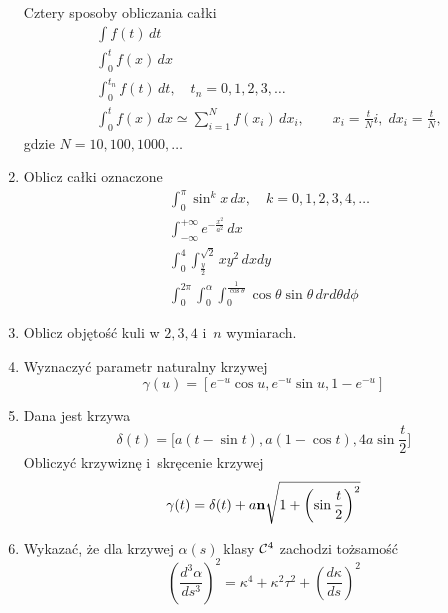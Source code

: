 \documentclass[a4paper,11pt]{article}
\begin{document}
\begin{enumerate}
  Cztery sposoby obliczania całki
  \begin{align}
    &\int f( t ) \, dt \\
    &\int_{ 0 }^{ t } f( x ) \, dx \\
    &\int_{ 0 }^{ t_{ n } } f( t ) \, dt, \quad
      t_{ n } = 0, 1, 2, 3, \ldots \\
    &\int_{ 0 }^{ t } f( x ) \, dx \simeq \sum_{ i = 1 }^{ N } f( x_{ i } ) \, dx_{ i },
      \qquad
      x_{ i } = \frac{ t }{ N } i,\; dx_{ i } = \frac{ t }{ N },
  \end{align}
  gdzie $N = 10, 100, 1000, \ldots$

\item Oblicz całki oznaczone
  \begin{align}
    &\int_{ 0 }^{ \pi } \sin^{ k } x \, dx, \quad
      k = 0, 1, 2, 3, 4, \ldots \\
    &\int_{ -\infty }^{ +\infty } e^{ -\frac{ x^{ 2 } }{ a^{ 2 } } } \, dx \\
    &\int_{ 0 }^{ 4 } \int_{ \frac{ y }{ 2 } }^{ \sqrt{ 2 } } x y^{ 2 } \, dx dy \\
    &\int_{ 0 }^{ 2\pi } \int_{ 0 }^{ \alpha } \int_{ 0 }^{ \frac{ 1 }{ \cos \theta } } \cos\theta \sin\theta \,
      dr d\theta d\phi
  \end{align}

\item Oblicz objętość kuli w $2, 3, 4$ i~$n$ wymiarach.

\item Wyznaczyć parametr naturalny krzywej
  \begin{equation}
    \label{eq:1}
    \gamma( u ) = \left[ e^{ -u } \cos u, e^{ -u } \sin u, 1 - e^{ -u } \right]
  \end{equation}

\item Dana jest krzywa
  \begin{equation}
    \label{eq:2}
    \delta( t )
    =
    \big[ a ( t - \sin t ), a ( 1 - \cos t ), 4a \sin \frac{ t }{ 2 } \big]
  \end{equation}
  Obliczyć krzywiznę i~skręcenie krzywej
  \begin{equation}
    \label{eq:3}
    \gamma( t )
    =
    \delta( t )
    + a \mathbf{n} \sqrt{ 1 + \left( \sin \frac{ t }{ 2 } \right)^{ 2 } }
  \end{equation}

\item Wykazać, że dla krzywej $\alpha( s )$ klasy $\mathcal{C}^{ 4 }$ zachodzi
  tożsamość
  \begin{equation}
    \label{eq:4}
    \left( \frac{ d^{ 3 } \alpha }{ d s^{ 3 } } \right)^{ 2 }
    =
    \kappa^{ 4 } + \kappa^{ 2 } \tau^{ 2 } + \left( \frac{ d \kappa }{ d s } \right)^{ 2 }
  \end{equation}


\end{enumerate}
\end{document}
